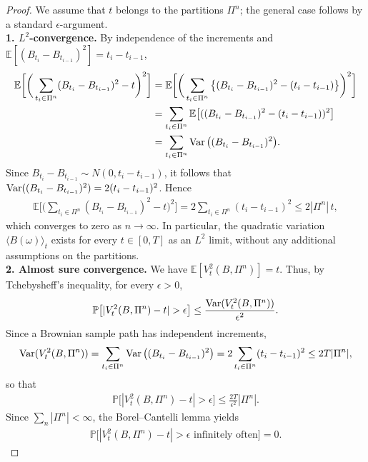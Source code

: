 \begin{proof}
	We assume that $t$ belongs to the partitions $\Pi^n$; the general case follows by a standard $\epsilon$-argument.\\
	\textbf{1. $L^2$-convergence.} By independence of the increments and $\mathbb{E}[(B_{t_i} - B_{t_{i-1}})^2] = t_i - t_{i-1}$,
	\begin{align*}
		\mathbb{E}\bigg[ \bigg( \sum_{t_i \in \Pi^n} (B_{t_i} - B_{t_{i-1}})^2 - t \bigg)^2 \bigg]
		&= \mathbb{E}\bigg[ \bigg( \sum_{t_i \in \Pi^n} \big\{ (B_{t_i} - B_{t_{i-1}})^2 - (t_i - t_{i-1}) \big\} \bigg)^2 \bigg]\\
		&= \sum_{t_i \in \Pi^n} \mathbb{E}\big[ ((B_{t_i} - B_{t_{i-1}})^2 - (t_i - t_{i-1}))^2 \big]\\
		&= \sum_{t_i \in \Pi^n} \operatorname{Var}\big( (B_{t_i} - B_{t_{i-1}})^2 \big).
	\end{align*}
	Since $B_{t_i} - B_{t_{i-1}} \sim N(0, t_i - t_{i-1})$, it follows that $\operatorname{Var}((B_{t_i} - B_{t_{i-1}})^2) = 2(t_i - t_{i-1})^2$. Hence
	\begin{align*}
		\mathbb{E}\bigg[ \bigg( \sum_{t_i \in \Pi^n} (B_{t_i} - B_{t_{i-1}})^2 - t \bigg)^2 \bigg]
		= 2 \sum_{t_i \in \Pi^n} (t_i - t_{i-1})^2 \le 2 |\Pi^n| \, t,
	\end{align*}
	which converges to zero as $n \rightarrow \infty$. In particular, the quadratic variation $\langle B(\omega) \rangle_t$ exists for every $t \in [0, T]$ as an $L^2$ limit, without any additional assumptions on the partitions.\\
	\textbf{2. Almost sure convergence.} We have $\mathbb{E}[V_t^2(B, \Pi^n)] = t$. Thus, by Tchebysheff's inequality, for every $\epsilon > 0$,
	\begin{align*}
		\mathbb{P}\big[ |V_t^2(B, \Pi^n) - t| > \epsilon \big] \le \frac{\operatorname{Var}(V_t^2(B, \Pi^n))}{\epsilon^2}.
	\end{align*}
	Since a Brownian sample path has independent increments,
	\begin{align*}
		\operatorname{Var}(V_t^2(B, \Pi^n)) = \sum_{t_i \in \Pi^n} \operatorname{Var}\big( (B_{t_i} - B_{t_{i-1}})^2 \big) = 2 \sum_{t_i \in \Pi^n} (t_i - t_{i-1})^2 \le 2T |\Pi^n|,
	\end{align*}
	so that
	\begin{align*}
		\mathbb{P}\big[ |V_t^2(B, \Pi^n) - t| > \epsilon \big] \le \frac{2T}{\epsilon^2} |\Pi^n|.
	\end{align*}
	Since $\sum_n |\Pi^n| < \infty$, the Borel--Cantelli lemma yields
	\begin{align*}
		\mathbb{P}\big[ |V_t^2(B, \Pi^n) - t| > \epsilon \text{ infinitely often} \big] = 0.

\end{align*}
\end{proof}
